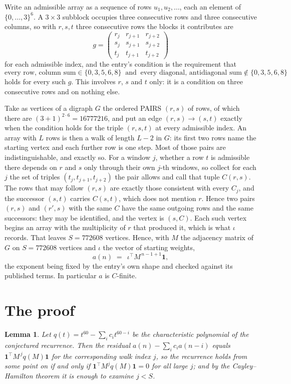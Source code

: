 \documentclass[11pt,a4paper]{article}
\theoremstyle{plain}
\newtheorem{lemma}[theorem]{Lemma}
\theoremstyle{definition}
\begin{document}
Write an admissible array as a sequence of rows $u_1,u_2,\dots$, each an element of
$\{0,\dots,3\}^{6}$. A $3\times3$ subblock occupies three consecutive rows and
three consecutive columns, so with $r,s,t$ three consecutive rows the blocks it
contributes are
\[
g=\begin{pmatrix}r_j&r_{j+1}&r_{j+2}\\ s_j&s_{j+1}&s_{j+2}\\ t_j&t_{j+1}&t_{j+2}\end{pmatrix}
\]
for each admissible index, and the entry's condition is the requirement that
\[
\text{every row, column sum} \in \{0,3,5,6,8\}\ \text{ and }\ \text{every diagonal, antidiagonal sum} \notin \{0,3,5,6,8\}
\]
holds for every such $g$. This involves $r$, $s$ and $t$ only: it is a condition on
three consecutive rows and on nothing else.

Take as vertices of a digraph $G$ the ordered PAIRS $(r,s)$ of rows, of which there are
$(3+1)^{2\cdot6}=16777216$, and put an edge $(r,s)\to(s,t)$ exactly when the condition
holds for the triple $(r,s,t)$ at every admissible index. An array with $L$ rows is then a
walk of length $L-2$ in $G$: its first two rows name the starting vertex and each further
row is one step. Most of those pairs are indistinguishable, and exactly so. For a window $j$, whether a row $t$ is admissible there depends on $r$ and $s$ only through their own $j$-th windows, so collect for each $j$ the set of triples $(t_j,t_{j+1},t_{j+2})$ the pair allows and call that tuple $C(r,s)$. The rows that may follow $(r,s)$ are exactly those consistent with every $C_j$, and the successor $(s,t)$ carries $C(s,t)$, which does not mention $r$. Hence two pairs $(r,s)$ and $(r',s)$ with the same $C$ have the same outgoing rows and the same successors: they may be identified, and the vertex is $(s,C)$. Each such vertex begins an array with the multiplicity of $r$ that produced it, which is what $\iota$ records. That leaves $S=772608$ vertices. Hence, with $M$ the adjacency matrix of $G$ on $S=772608$ vertices and
$\iota$ the vector of starting weights,
\[
a(n)\;=\;\,\iota^{\!\top}M^{\,n-1+1}\mathbf{1},
\]
the exponent being fixed by the entry's own shape and checked against its published terms.
In particular $a$ is $C$-finite.

\section{The proof}

\begin{lemma}\label{lem:crit}
Let $q(t)=t^{60}-\sum_i c_it^{60-i}$ be the characteristic polynomial of the
conjectured recurrence. Then the residual $a(n)-\sum_ic_ia(n-i)$ equals
$\mathbf{1}^{\!\top}M^{\,j}q(M)\mathbf{1}$ for the corresponding walk index
$j$, so the recurrence holds from some point on if and only if
$\mathbf{1}^{\!\top}M^{j}q(M)\mathbf{1}=0$ for all large $j$; and by the
Cayley--Hamilton theorem it is enough to examine $j<S$.
\end{lemma}
\end{document}
